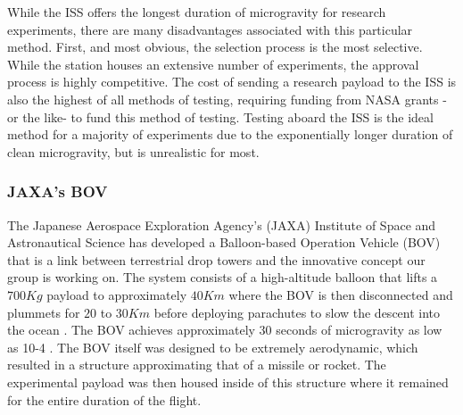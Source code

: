 While the ISS offers the longest duration of microgravity for research experiments, there are many disadvantages associated with this particular method. First, and most obvious, the selection process is the most selective. While the station houses an extensive number of experiments, the approval process is highly competitive. The cost of sending a research payload to the ISS is also the highest of all methods of testing, requiring funding from NASA grants -or the like- to fund this method of testing. Testing aboard the ISS is the ideal method for a majority of experiments due to the exponentially longer duration of clean microgravity, but is unrealistic for most.


\subsubsection{JAXA's BOV}

\indent\indent The Japanese Aerospace Exploration Agency’s (JAXA) Institute of Space and Astronautical Science has developed a Balloon-based Operation Vehicle (BOV) that is a link between terrestrial drop towers and the innovative concept our group is working on. The system consists of a high-altitude balloon that lifts a $700 Kg$ payload to approximately $40 Km$ where the BOV is then disconnected and plummets for $20$ to $30 Km$ before deploying parachutes to slow the descent into the ocean \cite{JAXALabs}. The BOV achieves approximately 30 seconds of microgravity as low as 10-4 \cite{JAXALabs}. The BOV itself was designed to be extremely aerodynamic, which resulted in a structure approximating that of a missile or rocket. The experimental payload was then housed inside of this structure where it remained for the entire duration of the flight.

